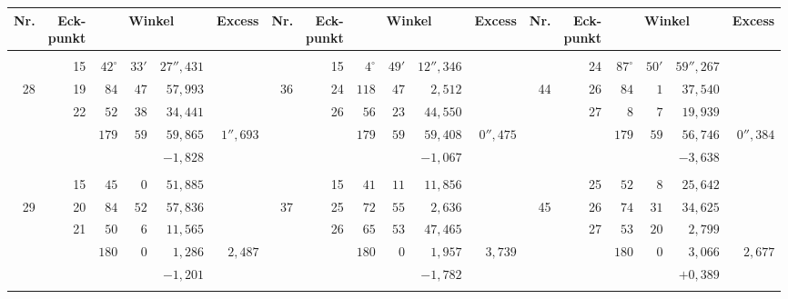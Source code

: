 \begin{center}
\begingroup
\fontsize{7.6}{9.2}\selectfont
\setlength{\tabcolsep}{2.1pt}
\renewcommand{\arraystretch}{1.04}
\begin{tabular}{|r|r|r@{\;}r@{\;}r|r||r|r|r@{\;}r@{\;}r|r||r|r|r@{\;}r@{\;}r|r|}
\hline
Nr.&\shortstack{Eck-\\punkt}&\multicolumn{3}{c|}{Winkel}&Excess & Nr.&\shortstack{Eck-\\punkt}&\multicolumn{3}{c|}{Winkel}&Excess & Nr.&\shortstack{Eck-\\punkt}&\multicolumn{3}{c|}{Winkel}&Excess\\ \hline
 &  &  &  &  &  &  &  &  &  &  &  &  &  &  &  &  & \\
 & 15 & $42^\circ$ & $33'$ & $27''{,}431$ &  &  & 15 & $4^\circ$ & $49'$ & $12''{,}346$ &  &  & 24 & $87^\circ$ & $50'$ & $59''{,}267$ & \\
28 & 19 & $84$ & $47$ & $57{,}993$ &  & 36 & 24 & $118$ & $47$ & $2{,}512$ &  & 44 & 26 & $84$ & $1$ & $37{,}540$ & \\
 & 22 & $52$ & $38$ & $34{,}441$ &  &  & 26 & $56$ & $23$ & $44{,}550$ &  &  & 27 & $8$ & $7$ & $19{,}939$ & \\
\cline{3-5}\cline{9-11}\cline{15-17}
 &  & $179$ & $59$ & $59{,}865$ & $1''{,}693$ &  &  & $179$ & $59$ & $59{,}408$ & $0''{,}475$ &  &  & $179$ & $59$ & $56{,}746$ & $0''{,}384$\\
 &  & \multicolumn{3}{r|}{$-1{,}828$} &  &  &  & \multicolumn{3}{r|}{$-1{,}067$} &  &  &  & \multicolumn{3}{r|}{$-3{,}638$} & \\
 &  &  &  &  &  &  &  &  &  &  &  &  &  &  &  &  & \\
 & 15 & $45$ & $0$ & $51{,}885$ &  &  & 15 & $41$ & $11$ & $11{,}856$ &  &  & 25 & $52$ & $8$ & $25{,}642$ & \\
29 & 20 & $84$ & $52$ & $57{,}836$ &  & 37 & 25 & $72$ & $55$ & $2{,}636$ &  & 45 & 26 & $74$ & $31$ & $34{,}625$ & \\
 & 21 & $50$ & $6$ & $11{,}565$ &  &  & 26 & $65$ & $53$ & $47{,}465$ &  &  & 27 & $53$ & $20$ & $2{,}799$ & \\
\cline{3-5}\cline{9-11}\cline{15-17}
 &  & $180$ & $0$ & $1{,}286$ & $2{,}487$ &  &  & $180$ & $0$ & $1{,}957$ & $3{,}739$ &  &  & $180$ & $0$ & $3{,}066$ & $2{,}677$\\
 &  & \multicolumn{3}{r|}{$-1{,}201$} &  &  &  & \multicolumn{3}{r|}{$-1{,}782$} &  &  &  & \multicolumn{3}{r|}{$+0{,}389$} & \\
 &  &  &  &  &  &  &  &  &  &  &  &  &  &  &  &  & \\

\end{tabular}
\end{center}
